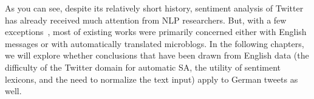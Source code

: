 



As you can see, despite its relatively short history, sentiment
analysis of Twitter has already received much attention from NLP
researchers.  But, with a few
exceptions~\cite[\eg{}][]{Basile:13,Bosco:13,Araque:15,Cesteros:15},
most of existing works were primarily concerned either with English
messages or with automatically translated microblogs.  In the
following chapters, we will explore whether conclusions that have been
drawn from English data (the difficulty of the Twitter domain for
automatic SA, the utility of sentiment lexicons, and the need to
normalize the text input) apply to German tweets as well.


